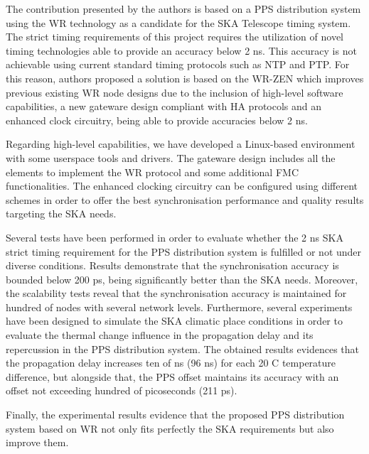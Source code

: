 The contribution presented by the authors is based on a PPS distribution system using the WR technology as a candidate for the SKA Telescope timing system. The strict timing requirements of this project requires the utilization of novel timing technologies able to provide an accuracy below 2 ns. This accuracy is not achievable using current standard timing protocols such as NTP and PTP.
For this reason, authors proposed a solution is based on the WR-ZEN which improves previous existing WR node designs 
due to the inclusion of high-level software capabilities, a new gateware design compliant with HA protocols and an enhanced clock circuitry, being able to provide accuracies below 2 ns.

Regarding high-level capabilities, we have developed a Linux-based environment with some userspace tools and drivers. The gateware design includes all the elements to implement the WR protocol and some additional FMC functionalities. The enhanced clocking circuitry can be configured using different schemes in order to offer the best synchronisation performance and quality results targeting the SKA needs. 

Several tests have been performed in order to evaluate whether the 2 ns SKA strict timing requirement for the PPS distribution system is fulfilled or not under diverse conditions.
Results demonstrate that the synchronisation accuracy is bounded below 200 ps, being significantly better than the SKA needs. Moreover, the scalability tests reveal that the synchronisation accuracy is maintained for hundred of nodes with several network levels. 
Furthermore, several experiments have been designed to simulate the SKA climatic place conditions 
in order to evaluate the thermal change influence in the propagation delay 
and its repercussion in the PPS distribution system. The obtained results evidences that the propagation delay increases ten of ns (96 ns) for each 20 C temperature difference, but alongside that, the PPS offset maintains its accuracy with an offset not exceeding hundred of picoseconds (211 ps). 

Finally, the experimental results evidence that the proposed PPS distribution system based on WR not only fits perfectly the SKA requirements but also improve them.



